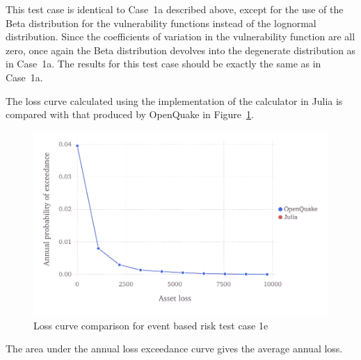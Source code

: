 This test case is identical to Case~1a described above, except for the use of the Beta distribution for the vulnerability functions instead of the lognormal distribution. Since the coefficients of variation in the vulnerability function are all zero, once again the Beta distribution devolves into the degenerate distribution as in Case~1a. The results for this test case should be exactly the same as in Case~1a.

The loss curve calculated using the implementation of the calculator in Julia is compared with that produced by OpenQuake in Figure~\ref{fig:lc-ebr-1e}.

\begin{figure}[htbp]
\centering
\includegraphics[width=12cm]{qareport/figures/fig-lc-ebr-1e}
\caption{Loss curve comparison for event based risk test case 1e}
\label{fig:lc-ebr-1e}
\end{figure}

The area under the annual loss exceedance curve gives the average annual loss.